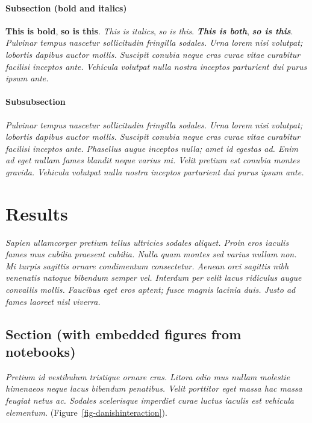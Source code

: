 \documentclass[
  a4paper,
]{scrbook}
\begin{document}
\subsubsection{Subsection (bold and
italics)}\label{subsection-bold-and-italics}

\textbf{This is bold}, \textbf{so is this}. \emph{This is italics},
\emph{so is this}. \textbf{\emph{This is both}}, \textbf{\emph{so is
this}}. \emph{Pulvinar tempus nascetur sollicitudin fringilla sodales.
Urna lorem nisi volutpat; lobortis dapibus auctor mollis. Suscipit
conubia neque cras curae vitae curabitur facilisi inceptos ante.
Vehicula volutpat nulla nostra inceptos parturient dui purus ipsum
ante.}

\subsubsection{Subsubsection}\label{subsubsection}

\emph{Pulvinar tempus nascetur sollicitudin fringilla sodales. Urna
lorem nisi volutpat; lobortis dapibus auctor mollis. Suscipit conubia
neque cras curae vitae curabitur facilisi inceptos ante. Phasellus augue
inceptos nulla; amet id egestas ad. Enim ad eget nullam fames blandit
neque varius mi. Velit pretium est conubia montes gravida. Vehicula
volutpat nulla nostra inceptos parturient dui purus ipsum ante.}

\chapter{Results}\label{results}

\emph{Sapien ullamcorper pretium tellus ultricies sodales aliquet. Proin
eros iaculis fames mus cubilia praesent cubilia. Nulla quam montes sed
varius nullam non. Mi turpis sagittis ornare condimentum consectetur.
Aenean orci sagittis nibh venenatis natoque bibendum semper vel.
Interdum per velit lacus ridiculus augue convallis mollis. Faucibus eget
eros aptent; fusce magnis lacinia duis. Justo ad fames laoreet nisl
viverra.}

\section{Section (with embedded figures from
notebooks)}\label{section-with-embedded-figures-from-notebooks}

\emph{Pretium id vestibulum tristique ornare cras. Litora odio mus
nullam molestie himenaeos neque lacus bibendum penatibus. Velit
porttitor eget massa hac massa feugiat netus ac. Sodales scelerisque
imperdiet curae luctus iaculis est vehicula elementum.}
(Figure~\ref{fig-danishinteraction}).
\end{document}
